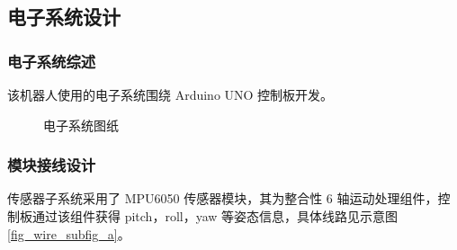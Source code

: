 \documentclass[a4paper]{ctexart}
\numberwithin{equation}{section}
\numberwithin{table}{section}
\numberwithin{figure}{section}
\begin{document}
\subsection{电子系统设计}

\subsubsection{电子系统综述}

该机器人使用的电子系统围绕 Arduino UNO 控制板开发。


\begin{figure}[H]
  \centering
  \hfill
  \caption{电子系统图纸}
  \label{fig_elec}
\end{figure}

\subsubsection{模块接线设计}

传感器子系统采用了 MPU6050 传感器模块，其为整合性 6 轴运动处理组件，控制板通过该组件获得 pitch，roll，yaw 等姿态信息，具体线路见示意图\ref{fig_wire_subfig_a}。
\end{document}
